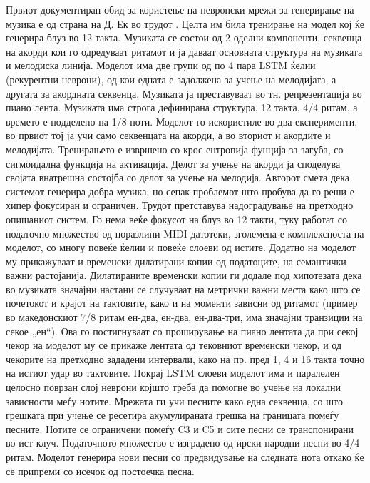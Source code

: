 Првиот документиран обид за користење на невронски мрежи за генерирање на музика е од страна на Д. Ек во трудот \cite{Eck2002}. Целта им била тренирање на модел кој ќе генерира блуз во 12 такта. Музиката се состои од 2 оделни компоненти, секвенца на акорди кои го одредуваат ритамот и ја даваат основната структура на музиката и мелодиска линија. Моделот има две групи од по 4 пара LSTM ќелии (рекурентни неврони), од кои едната е задолжена за учење на мелодијата, а другата за акордната секвенца. Музиката ја преставуваат во тн. репрезентација во пиано лента. Музиката има строга дефинирана структура, 12 такта, 4/4 ритам, а времето е подделено на 1/8 ноти. Моделот го искористиле во два експерименти, во првиот тој ја учи само секвенцата на акорди, а во вториот и акордите и мелодијата. Тренирањето е извршено со крос-ентропија фунција за загуба, со сигмоидална функција на активација. Делот за учење на акорди ја споделува својата внатрешна состојба со делот за учење на мелодија. Авторот смета дека системот генерира добра музика, но сепак проблемот што пробува да го реши е хипер фокусиран и ограничен. Трудот \cite{Eck2008} претставува надоградување на претходно опишаниот систем. Го нема веќе фокусот на блуз во 12 такти, туку работат со податочно множество од поразлини MIDI датотеки, зголемена е комплексноста на моделот, со многу повеќе ќелии и повеќе слоеви од истите. Додатно на моделот му прикажуваат и временски дилатирани копии од податоците, на семантички важни растојанија. Дилатираните временски копии ги додале под хипотезата дека во музиката значајни настани се случуваат на метрички важни места како што се почетокот и крајот на тактовите, како и на моменти зависни од ритамот (пример во македонскиот 7/8 ритам ен-два, ен-два, ен-два-три, има значајни транзиции на секое „ен“). Ова го постигнуваат со проширување на пиано лентата да при секој чекор на моделот му се прикаже лентата од тековниот временски чекор, и од чекорите на претходно зададени интервали, како на пр. пред 1, 4 и 16 такта точно на истиот удар во тактовите. Покрај LSTM слоеви моделот има и паралелен целосно поврзан слој неврони којшто треба да помогне во учење на локални зависности меѓу нотите. Мрежата ги учи песните како една секвенца, со што грешката при учење се ресетира акумулираната грешка на границата помеѓу песните. Нотите се ограничени помеѓу C3 и C5 и сите песни се транспонирани во ист клуч. Податочното множество е изградено од  ирски народни песни во 4/4 ритам. Моделот генерира нови песни со предвидување на следната нота откако ќе се припреми со исечок од постоечка песна.

